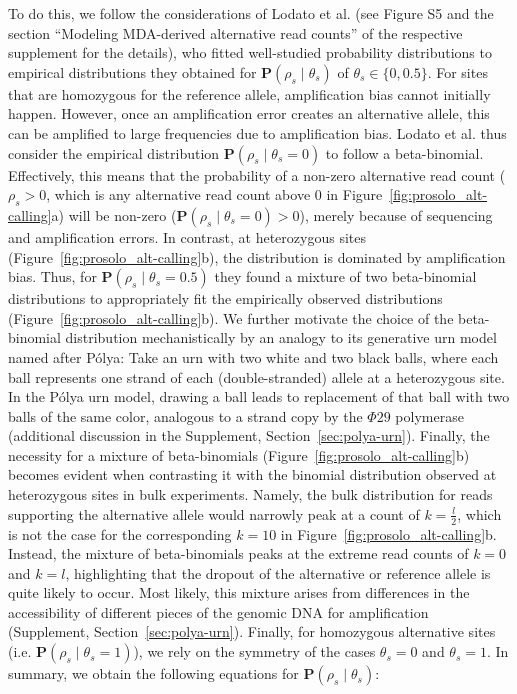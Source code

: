 \documentclass[12pt,inline]{wlscirep}
\begin{document}
To do this, we follow the considerations of Lodato et al.\cite{lodato_somatic_2015} (see Figure S5 and the section ``Modeling MDA-derived alternative read counts'' of the respective supplement for the details), who fitted well-studied probability distributions to empirical distributions they obtained for $\mathbf{P}(\rho_s\mid\theta_s)$ of $\theta_s\in\{0,0.5\}$.
For sites that are homozygous for the reference allele, amplification bias cannot initially happen.
However, once an amplification error creates an alternative allele, this can be amplified to large frequencies due to amplification bias.
Lodato et al.\cite{lodato_somatic_2015} thus consider the empirical distribution $\mathbf{P}(\rho_s\mid\theta_s=0)$ to follow a beta-binomial.
Effectively, this means that the probability of a non-zero alternative read count  ($\rho_s>0$, which is any alternative read count above $0$ in Figure~\ref{fig:prosolo_alt-calling}a) will be non-zero ($\mathbf{P}(\rho_s\mid\theta_s=0)>0$), merely because of sequencing and amplification errors.
In contrast, at heterozygous sites (Figure~\ref{fig:prosolo_alt-calling}b), the distribution is dominated by amplification bias.
Thus, for $\mathbf{P}(\rho_s\mid\theta_s=0.5)$ they found a mixture of two beta-binomial distributions to appropriately fit the empirically observed distributions (Figure~\ref{fig:prosolo_alt-calling}b).
We further motivate the choice of the beta-binomial distribution mechanistically by an analogy to its generative urn model named after Pólya\cite{eggenberger_uber_1923}:
Take an urn with two white and two black balls, where each ball represents one strand of each (double-stranded) allele at a heterozygous site.
In the Pólya urn model, drawing a ball leads to replacement of that ball with two balls of the same color, analogous to a strand copy by the $\Phi29$ polymerase (additional discussion in the Supplement, Section~\ref{sec:polya-urn}).
Finally, the necessity for a mixture of beta-binomials (Figure~\ref{fig:prosolo_alt-calling}b) becomes evident when contrasting it with the binomial distribution observed at heterozygous sites in bulk experiments.
Namely, the bulk distribution for reads supporting the alternative allele would narrowly peak at a count of $k=\frac{l}{2}$, which is not the case for the corresponding $k=10$ in Figure~\ref{fig:prosolo_alt-calling}b.
Instead, the mixture of beta-binomials peaks at the extreme read counts of $k=0$ and $k=l$, highlighting that the dropout of the alternative or reference allele is quite likely to occur.
Most likely, this mixture arises from differences in the accessibility of different pieces of the genomic DNA for amplification\cite{picher_trueprime_2016} (Supplement, Section~\ref{sec:polya-urn}).
Finally, for homozygous alternative sites (i.e. $\mathbf{P}(\rho_s\mid\theta_s=1)$), we rely on the symmetry of the cases $\theta_s=0$ and $\theta_s=1$.
In summary, we obtain the following equations for $\mathbf{P}(\rho_s\mid\theta_s)$:
\end{document}
